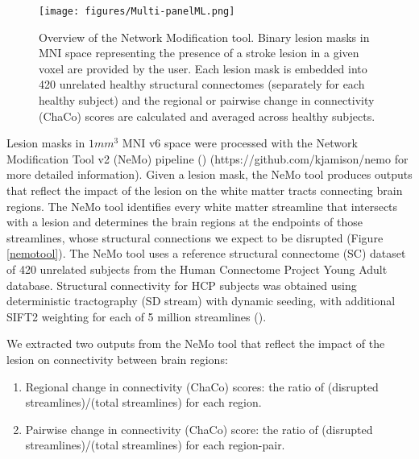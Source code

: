 \documentclass[10pt]{article}
\begin{document}
\begin{figure}[htp]
\centering
\texttt{[image: figures/Multi-panelML.png]}
\caption{Overview of the Network Modification tool. Binary lesion masks in MNI space representing the presence of a stroke lesion in a given voxel are provided by the user. Each lesion mask is embedded into 420 unrelated healthy structural connectomes (separately for each healthy subject) and the regional or pairwise change in connectivity (ChaCo) scores are calculated and averaged across healthy subjects. }
\label{fig1}
\end{figure}
Lesion masks in $1mm^3$ MNI v6 space were processed with the Network Modification Tool v2 (NeMo) pipeline (\cite{Kuceyeski2013-nk}) (https://github.com/kjamison/nemo for more detailed information). Given a lesion mask, the NeMo tool produces outputs that reflect the impact of the lesion on the white matter tracts connecting brain regions. The NeMo tool identifies every white matter streamline that intersects with a lesion and determines the brain regions at the endpoints of those streamlines, whose structural connections we expect to be disrupted (Figure \ref{nemotool}). The NeMo tool uses a reference structural connectome (SC) dataset of 420 unrelated subjects from the Human Connectome Project Young Adult database. Structural connectivity for HCP subjects was obtained using deterministic tractography (SD stream) with dynamic seeding, with additional SIFT2 weighting for each of 5 million streamlines (\cite{Smith2015-eb}).


We extracted two outputs from the NeMo tool that reflect the impact of the lesion on connectivity between brain regions:

\begin{enumerate}
\item Regional change in connectivity (ChaCo) scores: the ratio of (disrupted streamlines)/(total streamlines) for each region.
\item Pairwise change in connectivity (ChaCo) score: the ratio of (disrupted streamlines)/(total streamlines) for each region-pair.
\end{enumerate}
\end{document}
